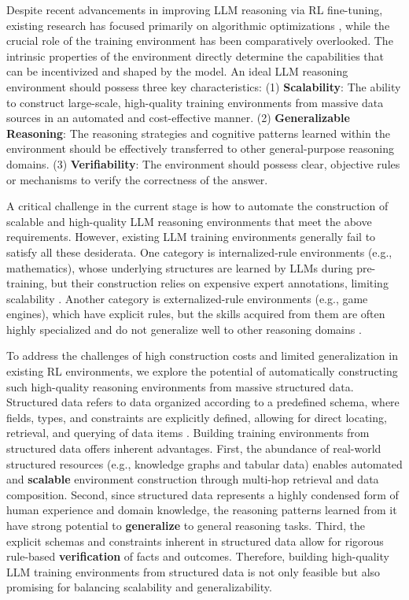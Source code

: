 \documentclass{article} %
\begin{document}
Despite recent advancements in improving LLM reasoning via RL fine-tuning, existing research has focused primarily on algorithmic optimizations \citep{shao2024deepseekmath, hu2025reinforce++, zheng2025group}, while the crucial role of the training environment has been comparatively overlooked. The intrinsic properties of the environment directly determine the capabilities that can be incentivized and shaped by the model. An ideal LLM reasoning environment should possess three key characteristics: (1) \textbf{Scalability}: The ability to construct large-scale, high-quality training environments from massive data sources in an automated and cost-effective manner. (2) \textbf{Generalizable Reasoning}: The reasoning strategies and cognitive patterns learned within the environment should be effectively transferred to other general-purpose reasoning domains.  (3) \textbf{Verifiability}: The environment should possess clear, objective rules or mechanisms to verify the correctness of the answer. 

A critical challenge in the current stage is how to automate the construction of scalable and high-quality LLM reasoning environments that meet the above requirements. However, existing LLM training environments generally fail to satisfy all these desiderata. One category is internalized-rule environments (e.g., mathematics), whose underlying structures are learned by LLMs during pre-training, but their construction relies on expensive expert annotations, limiting scalability \citep{cobbe2021training, lightman2023let}. Another category is externalized-rule environments (e.g., game engines), which have explicit rules, but the skills acquired from them are often highly specialized and do not generalize well to other reasoning domains \citep{wen2024reinforcing, zhang2025leveraging}. 

To address the challenges of high construction costs and limited generalization in existing RL environments, we explore the potential of automatically constructing such high-quality reasoning environments from massive structured data. Structured data refers to data organized according to a predefined schema, where fields, types, and constraints are explicitly defined, allowing for direct locating, retrieval, and querying of data items \citep{codd1970relational, chang2019nist}. Building training environments from structured data offers inherent advantages. First, the abundance of real-world structured resources (e.g., knowledge graphs and tabular data) enables automated and \textbf{scalable} environment construction through multi-hop retrieval and data composition. Second, since structured data represents a highly condensed form of human experience and domain knowledge, the reasoning patterns learned from it have strong potential to \textbf{generalize} to general reasoning tasks. Third, the explicit schemas and constraints inherent in structured data allow for rigorous rule-based \textbf{verification} of facts and outcomes. Therefore, building high-quality LLM training environments from structured data is not only feasible but also promising for balancing scalability and generalizability. 
\end{document}
